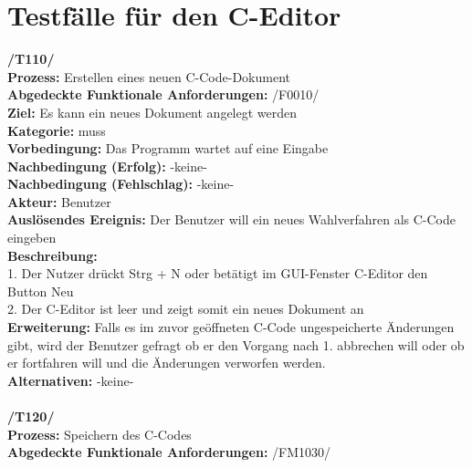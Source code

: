 \documentclass[a4paper]{scrreprt}
\begin{document}
\section{Testfälle für den C-Editor}
\textbf{/T110/}\\
\textbf{Prozess: }Erstellen eines neuen C-Code-Dokument  \\
\textbf{Abgedeckte Funktionale Anforderungen:} /F0010/\\
\textbf{Ziel:} Es kann ein neues Dokument angelegt werden\\
\textbf{Kategorie:} muss\\
\textbf{Vorbedingung:} Das Programm wartet auf eine Eingabe\\
\textbf{Nachbedingung (Erfolg):} -keine-\\
\textbf{Nachbedingung (Fehlschlag):} -keine-\\
\textbf{Akteur:} Benutzer\\
\textbf{Auslösendes Ereignis:} Der Benutzer will ein neues Wahlverfahren als C-Code eingeben\\
\textbf{Beschreibung:} \\
1. Der Nutzer drückt Strg + N oder betätigt im GUI-Fenster C-Editor den Button Neu \\
2. Der C-Editor ist leer und zeigt somit ein neues Dokument an \\
\textbf {Erweiterung:} Falls es im zuvor geöffneten C-Code ungespeicherte Änderungen gibt, wird der Benutzer gefragt ob er den Vorgang nach 1. abbrechen will oder ob er fortfahren will und die Änderungen verworfen werden. \\
\textbf {Alternativen:} -keine- \\ \\
\textbf{/T120/} \\ 
\textbf{Prozess: }Speichern des C-Codes  \\
\textbf{Abgedeckte Funktionale Anforderungen:} /FM1030/ \\
\end{document}
